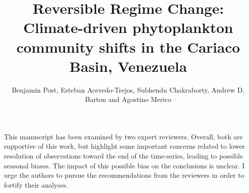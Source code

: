 \documentclass[12pt,english]{reviewresponse}
\title{Reversible Regime Change: Climate-driven phytoplankton community shifts in the Cariaco Basin, Venezuela}
\author{Benjamin Post, Esteban Acevedo-Trejos, Subhendu Chakraborty, Andrew D. Barton and Agostino Merico}
\begin{document}
\maketitle



\editor
\begin{generalcomment}
	This manuscript has been examined by two expert reviewers. Overall, both are supportive of this work, but highlight some important concerns related to lower resolution of observations toward the end of the time-series, leading to possible seasonal biases. The impact of this possible bias on the conclusions is unclear. I urge the authors to pursue the recommendations from the reviewers in order to fortify their analyses.
\end{generalcomment}
\end{document}
